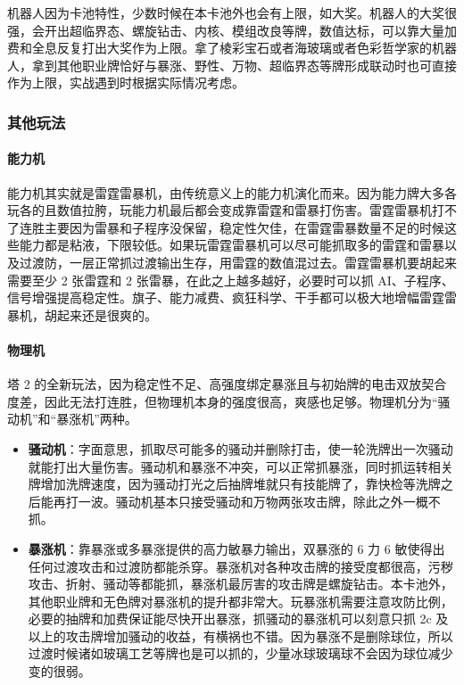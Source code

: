 \documentclass[12pt, a4paper]{article}
\begin{document}
机器人因为卡池特性，少数时候在本卡池外也会有上限，如大奖。机器人的大奖很强，会开出超临界态、螺旋钻击、内核、模组改良等牌，数值达标，可以靠大量加费和全息反复打出大奖作为上限。拿了棱彩宝石或者海玻璃或者色彩哲学家的机器人，拿到其他职业牌恰好与暴涨、野性、万物、超临界态等牌形成联动时也可直接作为上限，实战遇到时根据实际情况考虑。

\subsubsection{其他玩法}

\paragraph{能力机}
能力机其实就是雷霆雷暴机，由传统意义上的能力机演化而来。因为能力牌大多各玩各的且数值拉胯，玩能力机最后都会变成靠雷霆和雷暴打伤害。雷霆雷暴机打不了连胜主要因为雷暴和子程序没保留，稳定性欠佳，在雷霆雷暴数量不足的时候这些能力都是粘液，下限较低。如果玩雷霆雷暴机可以尽可能抓取多的雷霆和雷暴以及过渡防，一层正常抓过渡输出生存，用雷霆的数值混过去。雷霆雷暴机要胡起来需要至少 2 张雷霆和 2 张雷暴，在此之上越多越好，必要时可以抓 AI、子程序、信号增强提高稳定性。旗子、能力减费、疯狂科学、干手都可以极大地增幅雷霆雷暴机，胡起来还是很爽的。

\paragraph{物理机}
塔 2 的全新玩法，因为稳定性不足、高强度绑定暴涨且与初始牌的电击双放契合度差，因此无法打连胜，但物理机本身的强度很高，爽感也足够。物理机分为“骚动机”和“暴涨机”两种。
\begin{itemize}
    \item \textbf{骚动机}：字面意思，抓取尽可能多的骚动并删除打击，使一轮洗牌出一次骚动就能打出大量伤害。骚动机和暴涨不冲突，可以正常抓暴涨，同时抓运转相关牌增加洗牌速度，因为骚动打光之后抽牌堆就只有技能牌了，靠快检等洗牌之后能再打一波。骚动机基本只接受骚动和万物两张攻击牌，除此之外一概不抓。
    \item \textbf{暴涨机}：靠暴涨或多暴涨提供的高力敏暴力输出，双暴涨的 6 力 6 敏使得出任何过渡攻击和过渡防都能杀穿。暴涨机对各种攻击牌的接受度都很高，污秽攻击、折射、骚动等都能抓，暴涨机最厉害的攻击牌是螺旋钻击。本卡池外，其他职业牌和无色牌对暴涨机的提升都非常大。玩暴涨机需要注意攻防比例，必要的抽牌和加费保证能尽快开出暴涨，抓骚动的暴涨机可以刻意只抓 2c 及以上的攻击牌增加骚动的收益，有横祸也不错。因为暴涨不是删除球位，所以过渡时候诸如玻璃工艺等牌也是可以抓的，少量冰球玻璃球不会因为球位减少变的很弱。
\end{itemize}
\end{document}
